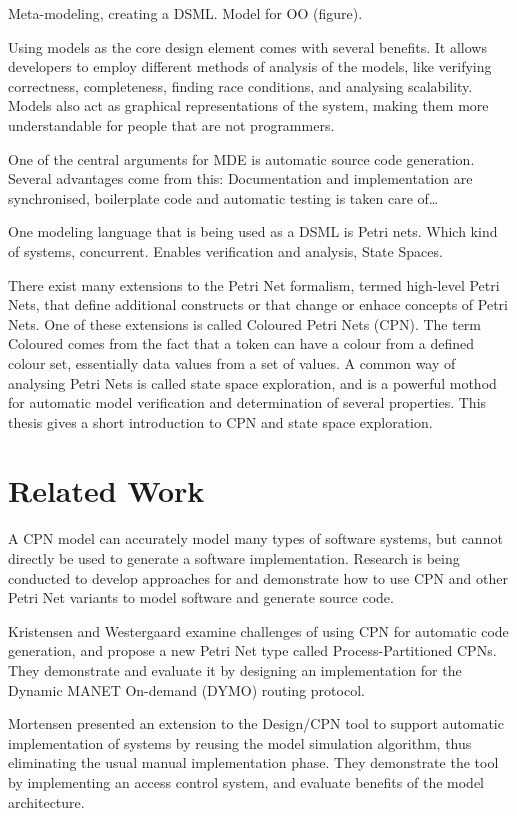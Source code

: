 Meta-modeling, creating a DSML. Model for OO (figure). 

Using models as the core design element comes with several benefits. It allows
developers to employ different methods of analysis of the models, like verifying
correctness, completeness, finding race conditions, and analysing scalability.
Models also act as graphical representations of the system, making them more understandable
for people that are not programmers. 

One of the central arguments for MDE is automatic source code generation.
Several advantages come from this: Documentation and implementation are 
synchronised, boilerplate code and automatic testing is taken care of\ldots
{}

One modeling language that is being used as a DSML is Petri nets. Which kind of
systems, concurrent.
Enables verification and analysis, State Spaces. 

There exist many extensions to the Petri Net formalism, termed high-level Petri
Nets, that define additional constructs or that change or enhace concepts of
Petri Nets. One of these extensions is called Coloured Petri Nets (CPN). The term
Coloured comes from the fact that a token can have a colour from a defined colour
set, essentially data values from a set of values. A common way of analysing
Petri Nets is called state space exploration, and is a powerful mothod for
automatic model verification and determination of several properties. This
thesis gives a short introduction to CPN and state space exploration.

\section{Related Work}

A CPN model can accurately model many types of software systems, but cannot
directly be used to generate a software implementation. Research is being
conducted to develop approaches for and demonstrate how to use CPN and other
Petri Net variants to model software and generate source code. 

Kristensen and Westergaard \cite{kristensen2010automatic} examine challenges of
using CPN for automatic code generation, and propose a new Petri Net type called
Process-Partitioned CPNs. They demonstrate and evaluate it by
designing an implementation for the Dynamic MANET On-demand (DYMO) routing
protocol.

Mortensen \cite{mortensen2000automatic} presented an extension to the Design/CPN
tool to support automatic implementation of systems by reusing the model
simulation algorithm, thus eliminating the usual manual implementation phase.
They demonstrate the tool by implementing an access control system, and
evaluate benefits of the model architecture.

